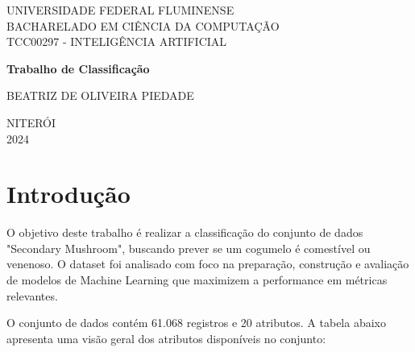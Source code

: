 \documentclass[12pt,a4paper]{article}
\begin{document}
	
\begin{titlepage}
	\centering
	\vspace{2cm}
	
	{UNIVERSIDADE FEDERAL FLUMINENSE} \\ [0.1cm]
	{BACHARELADO EM CIÊNCIA DA COMPUTAÇÃO} \\ [0.1cm]
	{TCC00297 - INTELIGÊNCIA ARTIFICIAL}
	
	\vfill
	
	{\Large \bfseries Trabalho de Classificação}
	
	\vfill
	
	{BEATRIZ DE OLIVEIRA PIEDADE}
	
	\vfill
	{NITERÓI} \\
	{2024}
\end{titlepage}

\tableofcontents

\newpage
\section{Introdução} 

\quad\space O objetivo deste trabalho é realizar a classificação do conjunto de dados "Secondary Mushroom", buscando prever se um cogumelo é comestível ou venenoso. O dataset foi analisado com foco na preparação, construção e avaliação de modelos de Machine Learning que maximizem a performance em métricas relevantes.

O conjunto de dados contém 61.068 registros e 20 atributos. A tabela abaixo apresenta uma visão geral dos atributos disponíveis no conjunto:
\end{document}
